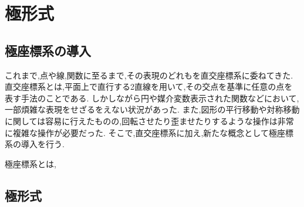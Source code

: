 \section{極形式}
  \subsection{極座標系の導入}
    これまで,点や線,関数に至るまで,その表現のどれもを直交座標系に委ねてきた.
    直交座標系とは,平面上で直行する2直線を用いて,その交点を基準に任意の点を表す手法のことである.
    しかしながら円や媒介変数表示された関数などにおいて,一部煩雑な表現をせざるをえない状況があった.
    また,図形の平行移動や対称移動に関しては容易に行えたものの,回転させたり歪ませたりするような操作は非常に複雑な操作が必要だった.
    そこで,直交座標系に加え,新たな概念として極座標系の導入を行う.
    
    極座標系とは,
  \subsection{極形式}